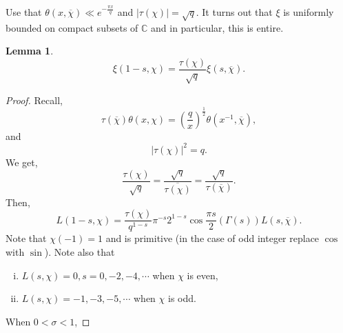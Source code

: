 \documentclass{article}
\newtheorem{lemma}{Lemma}[section]
\newcommand{\C}[0]{\mathbb{C}}
\begin{document}
Use that $\theta(x,\overline{\chi})\ll e^{-{\frac {\pi x} q}}$ and $\vert\tau(\chi)\vert=\sqrt{q}$. It turns out that $\xi$ is uniformly bounded on compact subsets of $\C$ and in particular, this is entire.
\begin{lemma}
  \begin{equation*}
    \xi(1-s,\chi) = {\frac {\tau(\chi)} {\sqrt{q}}}\xi(s,\overline{\chi}).
  \end{equation*}
\end{lemma} 
\begin{proof}
  Recall,
  \begin{equation*}
    \tau(\overline{\chi})\theta(x,\chi) =\left({\frac q x}\right)^{{\frac 1 2}}\theta(x^{-1},\overline{\chi}),
  \end{equation*}
  and 
  \begin{equation*}
    \vert\tau(\chi)\vert^2 = q.
  \end{equation*}
  We get,
  \begin{equation*}
    {\frac {\tau(\chi)} {\sqrt{q}}} = {\frac {\sqrt{q}} {\overline{\tau(\chi)}}}={\frac {\sqrt{q}} {\tau(\overline{\chi})}}.
  \end{equation*}
  Then,
  \begin{equation*}
    L(1-s,\chi) = {\frac {\tau(\chi)} {q^{1-s}}}\pi^{-s}2^{1-s}\cos{\frac {\pi s} 2}(\Gamma(s))L(s,\overline{\chi}).
  \end{equation*}
  Note that $\chi(-1) = 1$ and is primitive (in the case of odd integer replace $\cos$ with $\sin$).
  Note also that 
  \begin{enumerate}[i).]
    \item $L(s,\chi) = 0,s=0,-2,-4,\cdots$ when $\chi$ is even,
    \item $L(s,\chi) = -1,-3,-5,\cdots$ when $\chi$ is odd.
  \end{enumerate}
  When $0<\sigma<1$, 
\end{proof}
\end{document}
